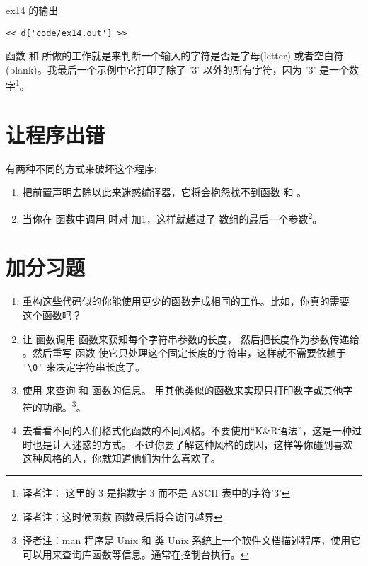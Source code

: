 \begin{code}{ex14 的输出}
\begin{lstlisting}
<< d['code/ex14.out'] >>
\end{lstlisting}
\end{code}

函数  和  所做的工作就是来判断一个输入的字符是否是字母(letter)
或者空白符(blank)。我最后一个示例中它打印了除了 '3' 以外的所有字符，因为 '3' 是一个数字\footnote{译者注： 这里的 3 是指数字 3 而不是 ASCII 表中的字符'3'}。

\section{让程序出错}

有两种不同的方式来破坏这个程序:
\begin{enumerate}
\item 把前置声明去除以此来迷惑编译器，它将会抱怨找不到函数  和 。
\item 当你在  函数中调用  时对  加1，这样就越过了  数组的最后一个参数\footnote{译者注：这时候函数  函数最后将会访问越界}。
\end{enumerate}


\section{加分习题}

\begin{enumerate}
\item 重构这些代码似的你能使用更少的函数完成相同的工作。比如，你真的需要  这个函数吗？
\item 让  函数调用  函数来获知每个字符串参数的长度，
    然后把长度作为参数传递给 。然后重写   函数
    使它只处理这个固定长度的字符串，这样就不需要依赖于 \verb|'\0'| 来决定字符串长度了。
\item 使用  来查询  和  函数的信息。
    用其他类似的函数来实现只打印数字或其他字符的功能。\footnote{译者注：man 程序是 Unix 和
    类 Unix 系统上一个软件文档描述程序，使用它可以用来查询库函数等信息。通常在控制台执行。}。
\item 去看看不同的人们格式化函数的不同风格。不要使用“K\&R语法”，这是一种过时也是让人迷惑的方式。
    不过你要了解这种风格的成因，这样等你碰到喜欢这种风格的人，你就知道他们为什么喜欢了。
\end{enumerate}

